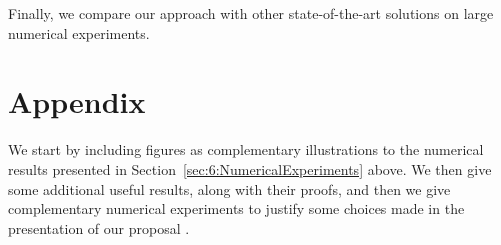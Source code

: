 %
Finally, we compare our approach with other state-of-the-art solutions on large numerical experiments.



\vfill{}  %

\minitoc

\newpage










\newpage
\section{Appendix}
\label{sec:6:appendix}

We start by including figures as complementary illustrations to the numerical results presented in Section~\ref{sec:6:NumericalExperiments} above.
We then give some additional useful results, along with their proofs, and then we give complementary numerical experiments to justify some choices made in the presentation of our proposal \GLRklUCB.


